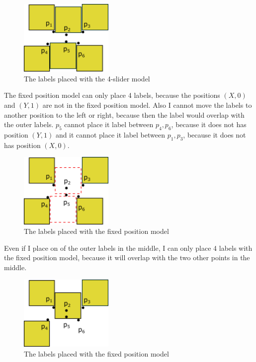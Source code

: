 \documentclass[a4paper,twoside,11pt]{article}
\begin{document}
\begin{figure}[H]
	\centering
	\includegraphics[width=0.4\textwidth]{A41b.png}
	\caption{The labels placed with the 4-slider model}
\end{figure}

The fixed position model can only place 4 labels, because the positions $(X,0)$ and $(Y,1)$ are not in the fixed position model.
Also I cannot move the labels to another position to the left or right, because then the label would overlap with the outer labels. 
 $ p_{5}$ cannot place it label between $p_{4}, p_{6}$, because it does not has position $(Y,1)$ and it cannot place it label between $p_{1}, p_{3}$, because it does not has position $(X,0)$.
\begin{figure}[H]
	\centering
	\includegraphics[width=0.4\textwidth]{A41c.png}
	\caption{The labels placed with the fixed position model}
\end{figure}

Even if I place on of the outer labels in the middle, I can only place 4 labels with the fixed position model, because it will overlap with the two other points in the middle.  
\begin{figure}[H]
	\centering
	\includegraphics[width=0.4\textwidth]{A41d.png}
	\caption{The labels placed with the fixed position model}
\end{figure}
\end{document}
